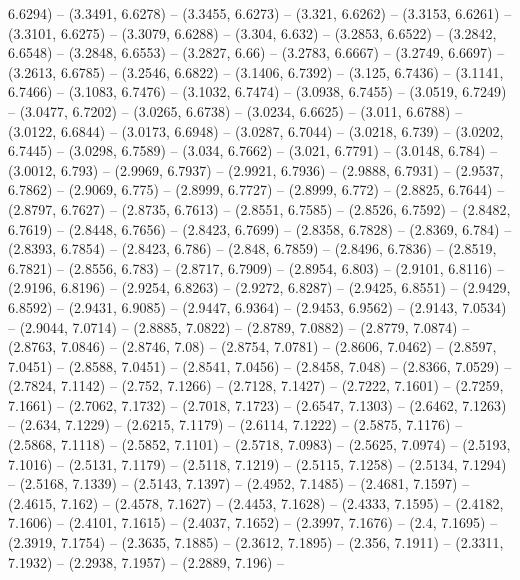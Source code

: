 {  6.6294) -- (3.3491, 6.6278) -- (3.3455, 6.6273) -- (3.321, 6.6262) -- (3.3153,
   6.6261) -- (3.3101, 6.6275) -- (3.3079, 6.6288) -- (3.304, 6.632) -- (3.2853,
   6.6522) -- (3.2842, 6.6548) -- (3.2848, 6.6553) -- (3.2827, 6.66) -- (3.2783,
   6.6667) -- (3.2749, 6.6697) -- (3.2613, 6.6785) -- (3.2546, 6.6822) -- 
  (3.1406, 6.7392) -- (3.125, 6.7436) -- (3.1141, 6.7466) -- (3.1083, 6.7476) --
   (3.1032, 6.7474) -- (3.0938, 6.7455) -- (3.0519, 6.7249) -- (3.0477, 6.7202) 
  -- (3.0265, 6.6738) -- (3.0234, 6.6625) -- (3.011, 6.6788) -- (3.0122, 6.6844)
   -- (3.0173, 6.6948) -- (3.0287, 6.7044) -- (3.0218, 6.739) -- (3.0202, 
  6.7445) -- (3.0298, 6.7589) -- (3.034, 6.7662) -- (3.021, 6.7791) -- (3.0148, 
  6.784) -- (3.0012, 6.793) -- (2.9969, 6.7937) -- (2.9921, 6.7936) -- (2.9888, 
  6.7931) -- (2.9537, 6.7862) -- (2.9069, 6.775) -- (2.8999, 6.7727) -- (2.8999,
   6.772) -- (2.8825, 6.7644) -- (2.8797, 6.7627) -- (2.8735, 6.7613) -- 
  (2.8551, 6.7585) -- (2.8526, 6.7592) -- (2.8482, 6.7619) -- (2.8448, 6.7656) 
  -- (2.8423, 6.7699) -- (2.8358, 6.7828) -- (2.8369, 6.784) -- (2.8393, 6.7854)
   -- (2.8423, 6.786) -- (2.848, 6.7859) -- (2.8496, 6.7836) -- (2.8519, 6.7821)
   -- (2.8556, 6.783) -- (2.8717, 6.7909) -- (2.8954, 6.803) -- (2.9101, 6.8116)
   -- (2.9196, 6.8196) -- (2.9254, 6.8263) -- (2.9272, 6.8287) -- (2.9425, 
  6.8551) -- (2.9429, 6.8592) -- (2.9431, 6.9085) -- (2.9447, 6.9364) -- 
  (2.9453, 6.9562) -- (2.9143, 7.0534) -- (2.9044, 7.0714) -- (2.8885, 7.0822) 
  -- (2.8789, 7.0882) -- (2.8779, 7.0874) -- (2.8763, 7.0846) -- (2.8746, 7.08) 
  -- (2.8754, 7.0781) -- (2.8606, 7.0462) -- (2.8597, 7.0451) -- (2.8588, 
  7.0451) -- (2.8541, 7.0456) -- (2.8458, 7.048) -- (2.8366, 7.0529) -- (2.7824,
   7.1142) -- (2.752, 7.1266) -- (2.7128, 7.1427) -- (2.7222, 7.1601) -- 
  (2.7259, 7.1661) -- (2.7062, 7.1732) -- (2.7018, 7.1723) -- (2.6547, 7.1303) 
  -- (2.6462, 7.1263) -- (2.634, 7.1229) -- (2.6215, 7.1179) -- (2.6114, 7.1222)
   -- (2.5875, 7.1176) -- (2.5868, 7.1118) -- (2.5852, 7.1101) -- (2.5718, 
  7.0983) -- (2.5625, 7.0974) -- (2.5193, 7.1016) -- (2.5131, 7.1179) -- 
  (2.5118, 7.1219) -- (2.5115, 7.1258) -- (2.5134, 7.1294) -- (2.5168, 7.1339) 
  -- (2.5143, 7.1397) -- (2.4952, 7.1485) -- (2.4681, 7.1597) -- (2.4615, 7.162)
   -- (2.4578, 7.1627) -- (2.4453, 7.1628) -- (2.4333, 7.1595) -- (2.4182, 
  7.1606) -- (2.4101, 7.1615) -- (2.4037, 7.1652) -- (2.3997, 7.1676) -- (2.4, 
  7.1695) -- (2.3919, 7.1754) -- (2.3635, 7.1885) -- (2.3612, 7.1895) -- (2.356,
   7.1911) -- (2.3311, 7.1932) -- (2.2938, 7.1957) -- (2.2889, 7.196) -- 
}

